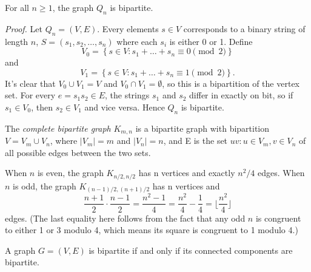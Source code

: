 \documentclass{tufte-handout}
\begin{document}
\begin{Proposition}
    For all \( n \geq 1 \), the graph \( Q_n \) is bipartite.
\end{Proposition}
\textit{Proof.} Let \( Q_n = (V,E) \). Every elements \( s\in V \) corresponds to a binary string of length \( n \),
\( S = (s_1, s_2, \ldots, s_n) \) where each \( s_i \) is either 0 or 1. Define
\[V_0 = \left\{s\in V: s_1 + \dots + s_n \equiv 0 \pmod 2\right\}\]
and
\[V_1 = \left\{s\in V: s_1 + \dots + s_n \equiv 1 \pmod 2\right\}.\]
It's clear that \( V_0 \cup V_1 =V \) and \( V_0 \cap V_1 = \emptyset \), so this is a bipartition of the vertex set.
For every \( e = s_1s_2 \in E \), the strings \( s_1 \) and \( s_2 \) differ in exactly on bit, so if
\( s_1 \in V_0 \), then \( s_2 \in V_1 \) and vice versa. Hence \( Q_n \) is bipartite. \qedsymbol

The \textit{complete bipartite graph} \( K_{m,n} \) is a bipartite graph with bipartition \( V = V_m \cup V_n \), where
\( \left|V_m\right| = m \) and \( \left|V_n\right| = n \), and E is the set \( {uv: u\in V_m, v\in V_n} \) of
all possible edges between the two sets.

When \( n \) is even, the graph \( K_{n/2,n/2} \) has n vertices and exactly \( n^2\slash 4 \) edges.
When \( n \) is odd, the graph \( K_{(n-1)/2,(n+1)/2} \) has n vertices and 
\[\frac{n+1}{2}\cdot \frac{n-1}{2} = \frac{n^2-1}{4} = \frac{n^2}{4}-\frac{1}{4} = \lfloor \frac{n^2}{4} \rfloor\]
edges. (The last equality here follows from the fact that any odd \( n \) is congruent to either 1 or 3 modulo 4,
which means its square is congruent to 1 modulo 4.)

\begin{Lemma}
    A graph \( G = (V,E) \) is bipartite if and only if its connected components are bipartite.
\end{Lemma}
\end{document}
